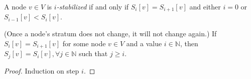 \begin{defn}
  A node $v \in V$ is \emph{$i$-stabilized} if and only if $S_i[v] =
  S_{i+1}[v]$ and either $i = 0$ or $S_{i-1}[v] < S_i[v]$.
\end{defn}

\begin{thm}\label{hiercomp/stability} (Once a node's stratum does not change,
  it will not change again.)
  If $S_{i}[v] = S_{i+1}[v]$ for some node $v \in V$ and a value $i
  \in \mathbb{N}$, then $S_{j}[v] = S_{i}[v], \forall j \in
  \mathbb{N}$ such that $j \geq i$.
\end{thm}

\begin{proof}
  Induction on step $i$.


\end{proof}
